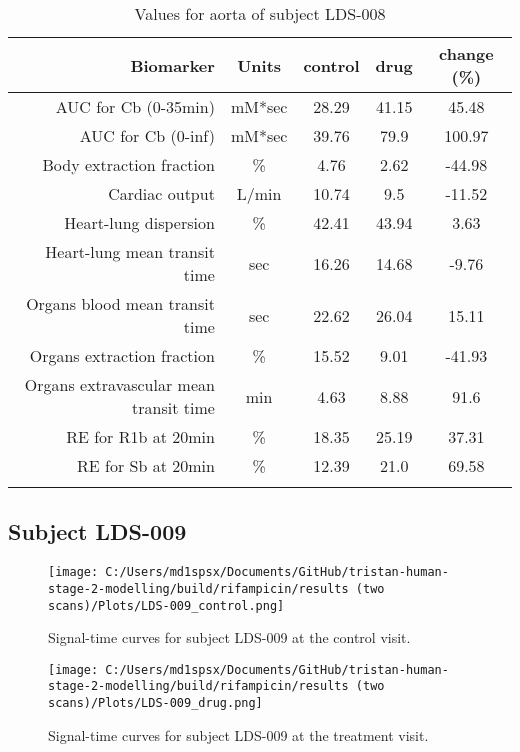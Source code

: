 \documentclass{epflreport}%
\begin{document}
\begin{longtable}{rcccc}%
\hline%
Biomarker&Units&control&drug&change (\%)\\%
\hline%
AUC for Cb (0{-}35min)&mM*sec&28.29&41.15&45.48\\%
AUC for Cb (0{-}inf)&mM*sec&39.76&79.9&100.97\\%
Body extraction fraction&\%&4.76&2.62&{-}44.98\\%
Cardiac output&L/min&10.74&9.5&{-}11.52\\%
Heart{-}lung dispersion&\%&42.41&43.94&3.63\\%
Heart{-}lung mean transit time&sec&16.26&14.68&{-}9.76\\%
Organs blood mean transit time&sec&22.62&26.04&15.11\\%
Organs extraction fraction&\%&15.52&9.01&{-}41.93\\%
Organs extravascular mean transit time&min&4.63&8.88&91.6\\%
RE for R1b at 20min&\%&18.35&25.19&37.31\\%
RE for Sb at 20min&\%&12.39&21.0&69.58\\%
\hline%
\caption{Values for aorta of subject LDS-008} \\%
\end{longtable}%
\clearpage%
\subsection{Subject LDS{-}009}%
\label{subsec:SubjectLDS{-}009}%

%


\begin{figure}[h!]%
\centering%
\texttt{[image: C:/Users/md1spsx/Documents/GitHub/tristan-human-stage-2-modelling/build/rifampicin/results (two scans)/Plots/LDS-009\_control.png]}%
\caption{Signal{-}time curves for subject LDS{-}009 at the control visit.}%
\end{figure}

%


\begin{figure}[h!]%
\centering%
\texttt{[image: C:/Users/md1spsx/Documents/GitHub/tristan-human-stage-2-modelling/build/rifampicin/results (two scans)/Plots/LDS-009\_drug.png]}%
\caption{Signal{-}time curves for subject LDS{-}009 at the treatment visit.}%
\end{figure}
\end{document}
